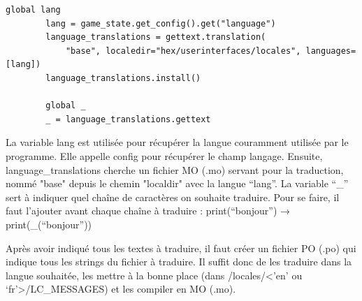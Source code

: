 \documentclass[12pt]{article}
\begin{document}
\begin{lstlisting}[style = PythonStyle]
global lang
        lang = game_state.get_config().get("language")
        language_translations = gettext.translation(
            "base", localedir="hex/userinterfaces/locales", languages=[lang])
        language_translations.install()

        global _
        _ = language_translations.gettext
\end{lstlisting}

La variable lang est utilisée pour récupérer la langue couramment utilisée par le programme. Elle appelle config pour récupérer le champ langage. Ensuite, language\_translations cherche un fichier MO (.mo) servant pour la traduction, nommé "base" depuis le chemin "localdir" avec la langue “lang”.
La variable “\_” sert à indiquer quel chaîne de caractères on souhaite traduire. Pour se faire, il faut l’ajouter avant chaque chaîne à traduire :
print(“bonjour”) → print(\_(“bonjour”))

\bigskip
Après avoir indiqué tous les textes à traduire, il faut créer un fichier PO (.po) qui indique tous les strings du fichier à traduire. Il suffit donc de les traduire dans la langue souhaitée, les mettre à la bonne place (dans /locales/<’en’ ou ‘fr’>/LC\_MESSAGES) et les compiler en MO (.mo).
\end{document}
